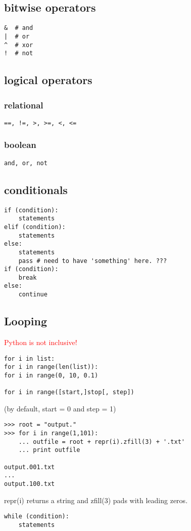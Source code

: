 \documentclass{article}
\begin{document}
\begin{multicols}{2}
\subsection{bitwise operators}
\begin{lstlisting}
&  # and
|  # or
^  # xor
!  # not
\end{lstlisting}

\subsection{logical operators}
\subsubsection{relational}
\begin{lstlisting}
==, !=, >, >=, <, <=
\end{lstlisting}
\subsubsection{boolean}
\begin{lstlisting}
and, or, not
\end{lstlisting}
\columnbreak

\subsection{conditionals}
\begin{lstlisting}
if (condition):
    statements
elif (condition):
    statements
else:
    statements
    pass # need to have 'something' here. ???
if (condition):
    break
else:
    continue
\end{lstlisting}

\subsection{Looping}
\textcolor{red}{Python is not inclusive!}

\begin{lstlisting}
for i in list:
for i in range(len(list)):
for i in range(0, 10, 0.1)

for i in range([start,]stop[, step])
\end{lstlisting}
(by default, start = 0 and step = 1)
\begin{lstlisting}
>>> root = "output."
>>> for i in range(1,101):
    ... outfile = root + repr(i).zfill(3) + '.txt'
    ... print outfile

output.001.txt
...
output.100.txt
\end{lstlisting}
repr(i) returns a string and zfill(3) pads with leading zeros.
\begin{lstlisting}
while (condition):
    statements
\end{lstlisting}


\end{multicols}
\end{document}
